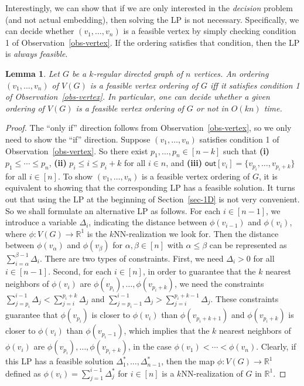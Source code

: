 \documentclass[11pt]{article}
\newtheorem{lemma}{Lemma}
\begin{document}
Interestingly, we can show that if we are only interested in the \emph{decision} problem (and not actual embedding), then solving the LP is not necessary.
Specifically, we can decide whether $(v_1,\dots,v_n)$ is a feasible vertex by simply checking condition 1 of Observation~\ref{obs-vertex}.
If the ordering satisfies that condition, then the LP is \emph{always feasible}.

\begin{lemma} \label{lem-LP}
Let $G$ be a $k$-regular directed graph of $n$ vertices.
An ordering $(v_1,\dots,v_n)$ of $V(G)$ is a feasible vertex ordering of $G$ iff it satisfies condition 1 of Observation~\ref{obs-vertex}.
In particular, one can decide whether a given ordering of $V(G)$ is a feasible vertex ordering of $G$ or not in $O(kn)$ time.
\end{lemma}
\begin{proof}
The ``only if'' direction follows from Observation~\ref{obs-vertex}, so we only need to show the ``if'' direction.
Suppose $(v_1,\dots,v_n)$ satisfies condition 1 of Observation~\ref{obs-vertex}.
So there exist $p_1,\dots,p_n \in [n-k]$ such that \textnormal{\bf (i)} $p_1 \leq \cdots \leq p_n$, \textnormal{\bf (ii)} $p_i \leq i \leq p_i+k$ for all $i \in n$, and \textnormal{\bf (iii)} $\mathsf{out}[v_i] = \{v_{p_i},\dots,v_{p_i+k}\}$ for all $i \in [n]$.
To show $(v_1,\dots,v_n)$ is a feasible vertex ordering of $G$, it is equivalent to showing that the corresponding LP has a feasible solution.
It turns out that using the LP at the beginning of Section~\ref{sec-1D} is not very convenient.
So we shall formulate an alternative LP as follows.
For each $i \in [n-1]$, we introduce a variable $\Delta_i$, indicating the distance between $\phi(v_{i-1})$ and $\phi(v_i)$, where $\phi:V(G) \rightarrow \mathbb{R}^1$ is the $k$NN-realization we look for.
Then the distance between $\phi(v_\alpha)$ and $\phi(v_\beta)$ for $\alpha,\beta \in [n]$ with $\alpha \leq \beta$ can be represented as $\sum_{i=\alpha}^{\beta-1} \Delta_i$.
There are two types of constraints.
First, we need $\Delta_i > 0$ for all $i \in [n-1]$.
Second, for each $i \in [n]$, in order to guarantee that the $k$ nearest neighbors of $\phi(v_i)$ are $\phi(v_{p_i}),\dots,\phi(v_{p_i+k})$, we need the constraints $\sum_{j=p_i}^{i-1} \Delta_j < \sum_{j=i}^{p_i+k} \Delta_j$ and $\sum_{j=p_i-1}^{i-1} \Delta_j > \sum_{j=i}^{p_i+k-1} \Delta_j$.
These constraints guarantee that $\phi(v_{p_i})$ is closer to $\phi(v_i)$ than $\phi(v_{p_i+k+1})$ and $\phi(v_{p_i+k})$ is closer to $\phi(v_i)$ than $\phi(v_{p_i-1})$, which implies that the $k$ nearest neighbors of $\phi(v_i)$ are $\phi(v_{p_i}),\dots,\phi(v_{p_i+k})$, in the case $\phi(v_1) < \cdots < \phi(v_n)$.
Clearly, if this LP has a feasible solution $\Delta_1^*,\dots,\Delta_{n-1}^*$, then the map $\phi:V(G) \rightarrow \mathbb{R}^1$ defined as $\phi(v_i) = \sum_{j=1}^{i-1} \Delta_j^*$ for $i \in [n]$ is a $k$NN-realization of $G$ in $\mathbb{R}^1$.


\end{proof}
\end{document}
